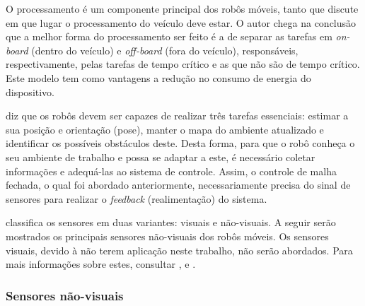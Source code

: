 O processamento é um componente principal dos robôs móveis, tanto que  
discute em que lugar o processamento do veículo deve estar. O autor chega na conclusão que a melhor forma do processamento ser feito é 
a de separar as tarefas em \textit{on-board} (dentro do veículo) e \textit{off-board} (fora do veículo), responsáveis, 
respectivamente, pelas tarefas de tempo crítico e as que não são de tempo crítico. Este modelo tem como vantagens a redução no consumo 
de energia do dispositivo.

  diz que os robôs devem ser capazes de realizar três tarefas essenciais: estimar a sua posição e orientação 
(pose), manter o mapa do ambiente atualizado e identificar os possíveis obstáculos deste. %
Desta forma, para que o robô conheça o seu ambiente de trabalho e possa se adaptar a este, é necessário coletar informações e 
adequá-las ao sistema de controle. Assim, o controle de malha fechada, o qual foi abordado anteriormente, 
necessariamente precisa do sinal de sensores para realizar o \textit{feedback} (realimentação) do sistema.\par
{} classifica os sensores em duas variantes: visuais e não-visuais.
A seguir serão mostrados os principais sensores não-visuais 
dos robôs móveis. Os sensores visuais, devido à não terem aplicação neste trabalho, não serão abordados. Para mais 
informações sobre estes, consultar \cite{dudek_mobile}, \cite{Intro_auto} e \cite{secchi2012}.


\subsubsection{Sensores não-visuais}


